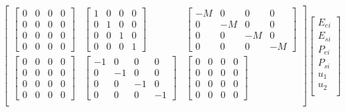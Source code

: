\documentclass[11pt]{article} %
\begin{document}
\begin{align}
\begin{bmatrix}
\begin{bmatrix}
            0 & 0 & 0 & 0\\
            0 & 0 & 0 & 0\\
            0 & 0 & 0 & 0\\
            0 & 0 & 0 & 0
        \end{bmatrix}  & 
        \begin{bmatrix}
            1 & 0 & 0 & 0\\
            0 & 1 & 0 & 0\\
            0 & 0 & 1 & 0\\
            0 & 0 & 0 & 1
        \end{bmatrix}   &
        \begin{bmatrix}
            -M & 0 & 0 & 0\\
            0 & -M & 0 & 0\\
            0 & 0 & -M & 0\\
            0 & 0 & 0 & -M
        \end{bmatrix} \\
        \begin{bmatrix}
            0 & 0 & 0 & 0\\
            0 & 0 & 0 & 0\\
            0 & 0 & 0 & 0\\
            0 & 0 & 0 & 0
        \end{bmatrix}  & 
        \begin{bmatrix}
            -1 & 0 & 0 & 0\\
            0 & -1 & 0 & 0\\
            0 & 0 & -1 & 0\\
            0 & 0 & 0 & -1
        \end{bmatrix}   &
        \begin{bmatrix}
            0 & 0 & 0 & 0\\
            0 & 0 & 0 & 0\\
            0 & 0 & 0 & 0\\
            0 & 0 & 0 & 0
        \end{bmatrix} \\
    \end{bmatrix}
    \begin{bmatrix}
        E_{ei} \\
        E_{si} \\
        P_{ei} \\
        P_{si} \\
        u_1\\
        u_2\\

\end{bmatrix}
\end{align}
\end{document}

